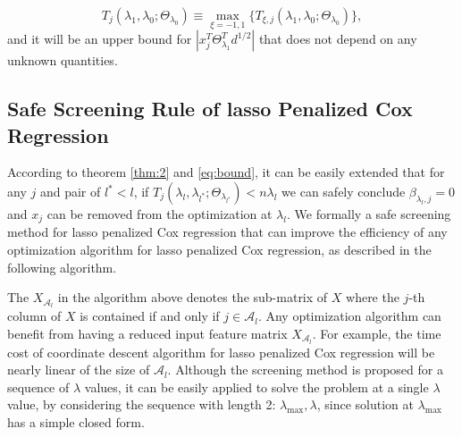 \begin{equation}
    \label{eq:bound}
    T_j(\lambda_1,\lambda_0;\Theta_{\lambda_0})\equiv\max_{\xi=-1,1}\{T_{\xi,j}(\lambda_1,\lambda_0;\Theta_{\lambda_0})\},
\end{equation}
and it will be an upper bound for $|x_j^T\Theta^T_{\lambda_1}d^{1/2}|$ that does not depend on any unknown quantities. 

\subsection{Safe Screening Rule of lasso Penalized Cox Regression}

According to theorem \ref{thm:2} and \eqref{eq:bound}, it can be easily extended that for any $j$ and pair of $l^*<l$, if $T_j(\lambda_{l},\lambda_{l^*};\Theta_{\lambda_{l^*}})<n\lambda_l$ we can safely conclude $\beta_{\lambda_l,j}=0$ and $x_j$ can be removed from the optimization at $\lambda_l$. We formally a safe screening method for lasso penalized Cox regression that can improve the efficiency of any optimization algorithm for lasso penalized Cox regression, as described in the following algorithm. 

\begin{algorithm}[H]

    
\end{algorithm}

The $X_{\mathcal{A}_l}$ in the algorithm above denotes the sub-matrix of $X$ where the $j$-th column of $X$ is contained if and only if $j\in{\mathcal{A}_l}$. Any optimization algorithm can benefit from having a reduced input feature matrix $X_{\mathcal{A}_l}$. For example, the time cost of coordinate descent algorithm for lasso penalized Cox regression \citep{simon2011regularization} will be nearly linear of the size of $\mathcal{A}_l$. Although the screening method is proposed for a sequence of $\lambda$ values, it can be easily applied to solve the problem at a single $\lambda$ value, by considering the sequence with length 2: $\lambda_{\max},\lambda$, since solution at $\lambda_{\max}$ has a simple closed form.

